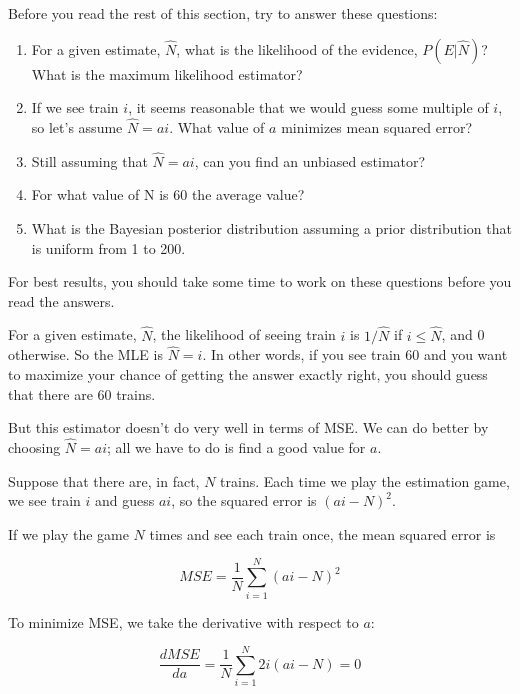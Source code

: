 \documentclass[12pt]{book}
\begin{document}
Before you read the rest of this section, try to answer these
questions:

\newcommand{\nhat}{\hat{N}}

\begin{enumerate}

\item For a given estimate, $\nhat$, what is the likelihood of the
  evidence, $P(E|\nhat)$?  What is the maximum likelihood estimator?

\item If we see train $i$, it seems reasonable that we would guess
  some multiple of $i$, so let's assume $\nhat = a i$.  What value of
  $a$ minimizes mean squared error?

\item Still assuming that $\nhat = a i$, can you find an unbiased
  estimator?

\item For what value of N is 60 the average value?

\item What is the Bayesian posterior distribution assuming a prior
distribution that is uniform from 1 to 200.

\end{enumerate}

For best results, you should take some time to work on these questions
before you read the answers.

For a given estimate, $\nhat$, the likelihood of seeing train $i$ is
$1 / \nhat$ if $i \le \nhat$, and 0 otherwise.  So the MLE is $\nhat =
i$.  In other words, if you see train 60 and you want to maximize your
chance of getting the answer exactly right, you should guess that there
are 60 trains.

But this estimator doesn't do very well in terms of MSE.  We can do
better by choosing $\nhat = a i$; all we have to do is find a good
value for $a$.

Suppose that there are, in fact, $N$ trains.  Each time we play
the estimation game, we see train $i$ and guess $ai$, so the squared
error is $(ai - N)^2$.

If we play the game $N$ times and see each train once, the mean
squared error is 

\[ MSE = \frac{1}{N} \sum_{i=1}^N (ai - N)^2 \]

To minimize MSE, we take the derivative with respect to $a$:

\[ \frac{d MSE}{da} = \frac{1}{N} \sum_{i=1}^N 2i (ai - N) = 0 \]
\end{document}
